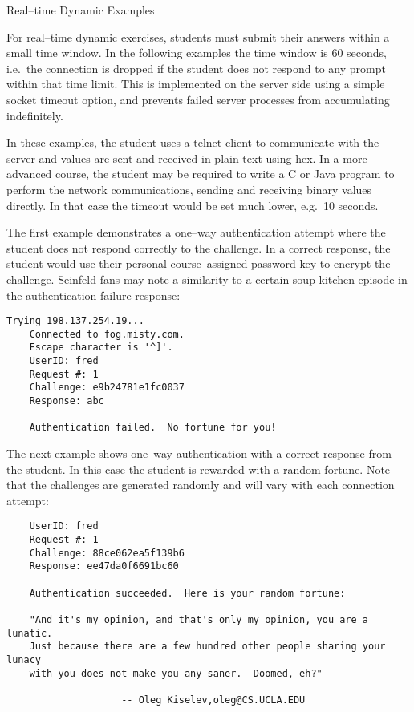 \documentclass[12pt]{article}
\begin{document}
\vspace{22pt}
Real--time Dynamic Examples
\vspace{11pt}

For real--time dynamic exercises, students must submit their answers
within a small time window.  In the following examples the time window
is 60 seconds, i.e.\ the connection is dropped if the student does not
respond to any prompt within that time limit.
This is implemented on the server side using a simple socket timeout
option, and prevents failed server processes from accumulating
indefinitely.

\vspace{11pt}

In these examples, the student uses a telnet client to communicate with the
server and values are sent and received in plain text using hex.
In a more advanced course, the student may be required to write a
C or Java program to perform the network communications, sending and
receiving binary values directly.  In that case
the timeout would be set much lower, e.g.\ 10 seconds.

The first example demonstrates a one--way
authentication attempt where the student does not respond correctly to the challenge.
In a correct response, the student would use their personal course--assigned
password key to encrypt the challenge.  Seinfeld fans may note a similarity
to a certain soup kitchen episode in the authentication failure response:

\begin{verbatim}
Trying 198.137.254.19...
    Connected to fog.misty.com.
    Escape character is '^]'.
    UserID: fred
    Request #: 1
    Challenge: e9b24781e1fc0037
    Response: abc

    Authentication failed.  No fortune for you!
\end{verbatim}

The next example shows one--way authentication with a correct response
from the student.  In this case the student is rewarded with a random fortune.
Note that the challenges are generated randomly and will vary with each
connection attempt:

\begin{verbatim}
    UserID: fred
    Request #: 1
    Challenge: 88ce062ea5f139b6
    Response: ee47da0f6691bc60

    Authentication succeeded.  Here is your random fortune:

    "And it's my opinion, and that's only my opinion, you are a lunatic.
    Just because there are a few hundred other people sharing your lunacy
    with you does not make you any saner.  Doomed, eh?"

                    -- Oleg Kiselev,oleg@CS.UCLA.EDU
\end{verbatim}
\end{document}
